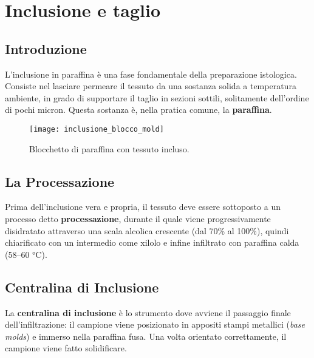 \chapter{Inclusione e taglio}


\section{Introduzione}

L'inclusione in paraffina è una fase fondamentale della preparazione istologica. Consiste nel lasciare permeare il tessuto da una sostanza solida a temperatura ambiente, in grado di supportare il taglio in sezioni sottili, solitamente dell'ordine di pochi micron. Questa sostanza è, nella pratica comune, la \textbf{paraffina}.


 \begin{figure}[h]
 \centering
 \texttt{[image: inclusione\_blocco\_mold]} 
 \caption{Blocchetto di paraffina con tessuto incluso.}
 \end{figure}

\section{La Processazione}

Prima dell'inclusione vera e propria, il tessuto deve essere sottoposto a un processo detto \textbf{processazione}, durante il quale viene progressivamente disidratato attraverso una scala alcolica crescente (dal 70\% al 100\%), quindi chiarificato con un intermedio come xilolo e infine infiltrato con paraffina calda (58–60 °C).

\section{Centralina di Inclusione}

La \textbf{centralina di inclusione} è lo strumento dove avviene il passaggio finale dell'infiltrazione: il campione viene posizionato in appositi stampi metallici (\textit{base molds}) e immerso nella paraffina fusa. Una volta orientato correttamente, il campione viene fatto solidificare.


